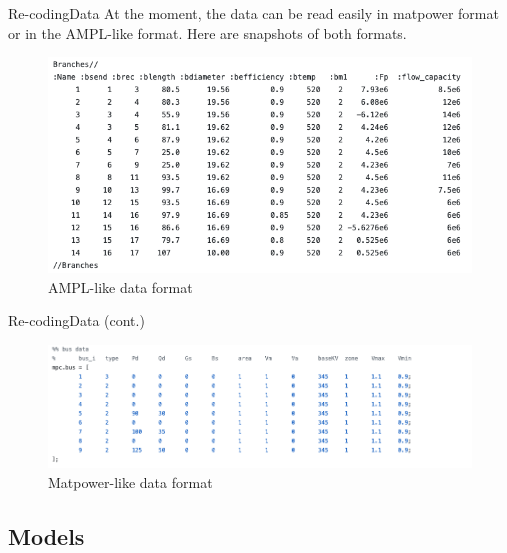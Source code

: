 \documentclass[handout]{beamer}
\begin{document}
\begin{frame}[t]{Re-coding}{Data}
At the moment, the data can be read easily in matpower format or in the AMPL-like format. Here are snapshots of both formats.

\begin{figure}
\begin{center}
\includegraphics[height=0.55\textheight]{AMPLlike2.png}
\end{center}
\caption{AMPL-like data format}\label{fig:ampllike}
\end{figure}
\end{frame}


\begin{frame}{Re-coding}{Data (cont.)}

\begin{figure}
\begin{center}
\includegraphics[width=\textwidth]{Matpowerlike2.png}
\end{center}
\caption{Matpower-like data format}\label{fig:matpowerlike}
\end{figure}


\end{frame}

\subsection*{Models}
\end{document}
